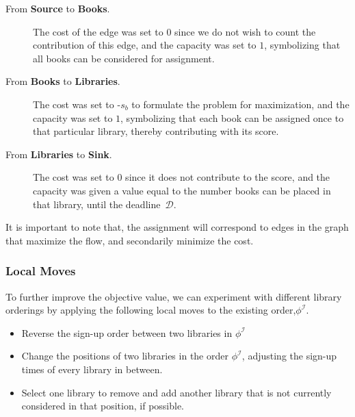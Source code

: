 \begin{description}
  \item[From \textbf{Source} to \textbf{Books}.] The cost of the edge was set
    to $0$ since we do not wish to count the contribution of this edge, and the capacity
    was set to $1$, symbolizing that all books can be considered for assignment.

  \item[From \textbf{Books} to \textbf{Libraries}.] The cost was set to -$s_{b}$ to
    formulate the problem for maximization, and the capacity was set to $1$, symbolizing
    that each book can be assigned once to that particular library, thereby
    contributing with its score.

  \item[From \textbf{Libraries} to \textbf{Sink}.] The cost was set to $0$
    since it does not contribute to the score, and the capacity was given a value
    equal to the number books can be placed in that library, until the deadline~$\mathcal{D}$.
\end{description}

It is important to note that, the assignment will correspond to edges in the
graph that maximize the flow, and secondarily minimize the cost.

\subsubsection*{Local Moves}

To further improve the objective value, we can experiment with different library
orderings by applying the following local moves to the existing order,$\phi^\mathcal{I}$.

\begin{itemize}
  \item Reverse the sign-up order between two libraries in $\phi^\mathcal{I}$
  \item Change the positions of two libraries in the order $\phi^\mathcal{I}$,
        adjusting the sign-up times of every library in between.
  \item Select one library to remove and add another library that is not
        currently considered in that position, if possible.
\end{itemize}